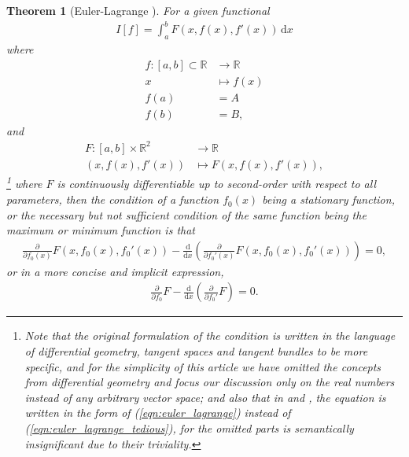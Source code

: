 \documentclass[12pt,a4paper]{article}
\newtheorem{theorem}{Theorem}
\newcommand{\eqnref}[1]{(\ref{#1})}
\begin{document}
\begin{theorem}[Euler-Lagrange \cite{euler_calc_var}]
\label{thm:euler_lagrange}
For a given functional
\begin{gather}
\label{eqn:euler_lagrange_functional}
I[f]=\int_a^bF(x,f(x),f'(x))\,\mathrm{d}x
\end{gather}
where
\begin{align*}
f:[a,b]\subset\mathbb{R}&\to\mathbb{R}\\
x&\mapsto f(x)\\
f(a)&=A\\
f(b)&=B,
\end{align*}
and
\begin{align*}
F:[a,b]\times\mathbb{R}^2&\to\mathbb{R}\\
(x,f(x),f'(x))&\mapsto F(x,f(x),f'(x)),
\end{align*}
\footnote{Note that the original formulation of the condition \cite{euler_calc_var} is written in the language of differential geometry, tangent spaces and tangent bundles to be more specific, and for the simplicity of this article we have omitted the concepts from differential geometry and focus our discussion only on the real numbers instead of any arbitrary vector space; and also that in \cite{euler_calc_var} and \cite{weinstock_calc_var}, the equation is written in the form of \eqnref{eqn:euler_lagrange} instead of \eqnref{eqn:euler_lagrange_tedious}, for the omitted parts is semantically insignificant due to their triviality.}
where $F$ is continuously differentiable up to second-order with respect to all parameters, then the condition of a function $f_0(x)$ being a stationary function, or the necessary but not sufficient condition of the same function being the maximum or minimum function is that
\begin{gather}
\label{eqn:euler_lagrange_tedious}
\frac{\partial}{\partial f_0(x)}F(x,f_0(x),{f_0}'(x))-\frac{{\mathrm{d}}}{\mathrm{d}x}\left(\frac{\partial}{\partial {f_0}'(x)}F(x,f_0(x),{f_0}'(x))\right)=0,
\end{gather}
or in a more concise and implicit expression,
\begin{gather}
\label{eqn:euler_lagrange}
\frac{\partial}{\partial f_0}F-\frac{\mathrm{d}}{\mathrm{d}x}\left(\frac{\partial}{\partial {f_0}'}F\right)=0.
\end{gather}
\end{theorem}
\end{document}
